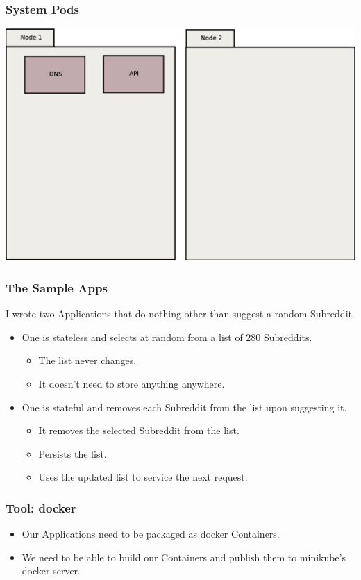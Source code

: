 \documentclass{beamer}
\begin{document}
\begin{frame}
    \frametitle{System Pods}
    \includegraphics[width=\textwidth,height=0.85\textheight,keepaspectratio]{graphics/01-systemPods.eps}
\end{frame}

\begin{frame}
    \frametitle{The Sample Apps}
    I wrote two Applications that do nothing other than suggest a random Subreddit.
    \begin{itemize}
        \item One is stateless and selects at random from a list of 280 Subreddits.
        \begin{itemize}
            \item The list never changes.
            \item It doesn't need to store anything anywhere.
        \end{itemize}
        \item One is stateful and removes each Subreddit from the list upon suggesting it.
        \begin{itemize}
            \item It removes the selected Subreddit from the list.
            \item Persists the list.
            \item Uses the updated list to service the next request.
        \end{itemize}
    \end{itemize}
\end{frame}

\begin{frame}
    \frametitle{Tool: docker\footnotemark}
    \begin{itemize}
        \item Our Applications need to be packaged as docker Containers.
        \item We need to be able to build our Containers and publish them to minikube's docker server.
    \end{itemize}
\end{frame}
\end{document}
